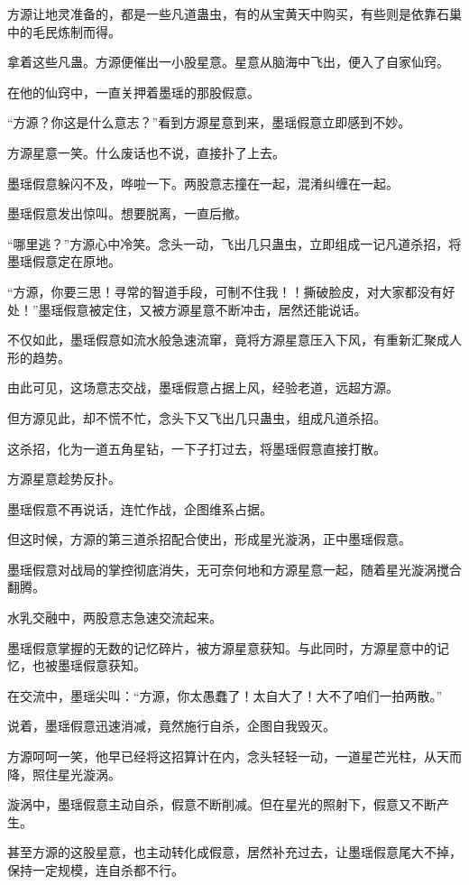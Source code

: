 \begin{this_body}
方源让地灵准备的，都是一些凡道蛊虫，有的从宝黄天中购买，有些则是依靠石巢中的毛民炼制而得。

拿着这些凡蛊。方源便催出一小股星意。星意从脑海中飞出，便入了自家仙窍。

在他的仙窍中，一直关押着墨瑶的那股假意。

“方源？你这是什么意志？”看到方源星意到来，墨瑶假意立即感到不妙。

方源星意一笑。什么废话也不说，直接扑了上去。

墨瑶假意躲闪不及，哗啦一下。两股意志撞在一起，混淆纠缠在一起。

墨瑶假意发出惊叫。想要脱离，一直后撤。

“哪里逃？”方源心中冷笑。念头一动，飞出几只蛊虫，立即组成一记凡道杀招，将墨瑶假意定在原地。

“方源，你要三思！寻常的智道手段，可制不住我！！撕破脸皮，对大家都没有好处！”墨瑶假意被定住，又被方源星意不断冲击，居然还能说话。

不仅如此，墨瑶假意如流水般急速流窜，竟将方源星意压入下风，有重新汇聚成人形的趋势。

由此可见，这场意志交战，墨瑶假意占据上风，经验老道，远超方源。

但方源见此，却不慌不忙，念头下又飞出几只蛊虫，组成凡道杀招。

这杀招，化为一道五角星钻，一下子打过去，将墨瑶假意直接打散。

方源星意趁势反扑。

墨瑶假意不再说话，连忙作战，企图维系占据。

但这时候，方源的第三道杀招配合使出，形成星光漩涡，正中墨瑶假意。

墨瑶假意对战局的掌控彻底消失，无可奈何地和方源星意一起，随着星光漩涡搅合翻腾。

水乳交融中，两股意志急速交流起来。

墨瑶假意掌握的无数的记忆碎片，被方源星意获知。与此同时，方源星意中的记忆，也被墨瑶假意获知。

在交流中，墨瑶尖叫：“方源，你太愚蠢了！太自大了！大不了咱们一拍两散。”

说着，墨瑶假意迅速消减，竟然施行自杀，企图自我毁灭。

方源呵呵一笑，他早已经将这招算计在内，念头轻轻一动，一道星芒光柱，从天而降，照住星光漩涡。

漩涡中，墨瑶假意主动自杀，假意不断削减。但在星光的照射下，假意又不断产生。

甚至方源的这股星意，也主动转化成假意，居然补充过去，让墨瑶假意尾大不掉，保持一定规模，连自杀都不行。


\end{this_body}
